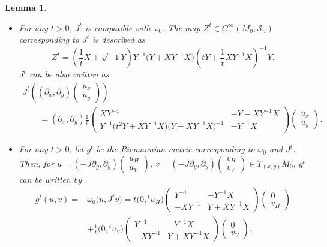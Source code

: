 \documentclass[10pt,a4paper]{amsart}
\numberwithin{equation}{section}
\newtheorem{Lemma}[Theorem]{Lemma}
\begin{document}
\begin{Lemma}\label{compatibility2}\quad
\begin{itemize}\itemsep=0pt
\item[$(1)$] For any $t>0$, $J^t$ is compatible with $\omega_0$. The map $Z^t\in C^\infty ( M_0,{\mathcal S}_n)$ corresponding to $J^t$ is described as
\begin{equation*}
Z^t=\left(\frac{1}{t}X+\sqrt{-1}Y\right)Y^{-1}\bigl(Y+XY^{-1}X\bigr)\left(tY+\frac{1}{t}XY^{-1}X\right)^{-1}Y.
\end{equation*}
$J^t$ can be also written as
\begin{gather*}
J^t\left((\partial_x, \partial_y)
\begin{pmatrix}
u_x \\
u_y
\end{pmatrix}\right)\\
\qquad=(\partial_x, \partial_y)
\frac{1}{t}
\begin{pmatrix}
XY^{-1} & -Y-XY^{-1}X \\
Y^{-1}\bigl(t^2Y+XY^{-1}X\bigr)\bigl(Y+XY^{-1}X\bigr)^{-1} & -Y^{-1}X
\end{pmatrix}
\begin{pmatrix}
u_x \\
u_y
\end{pmatrix}.
\end{gather*}
\item[$(2)$] For any $t>0$, let $g^t$ be the Riemannian metric corresponding to $\omega_0$ and $J^t$. Then, for $u=(-J\partial_y, \partial_y)
\left(\begin{smallmatrix}
u_H\\
u_V
\end{smallmatrix}\right)$, $v=(-J\partial_y, \partial_y)
\left(\begin{smallmatrix}
v_H\\
v_V
\end{smallmatrix}\right)
\in T_{(x,y)}M_0$, $g^t$ can be written by
\begin{align*}
g^t(u,v)={}&\omega_0\bigl( u,J^tv \bigr)
= t\bigl(0,{}^tu_H\bigr)
\begin{pmatrix}
Y^{-1} & -Y^{-1}X \\
-XY^{-1} & Y+XY^{-1}X
\end{pmatrix}
\begin{pmatrix}
0\\
v_H
\end{pmatrix}
\\
&
+\frac{1}{t}\bigl(0,{}^tu_V\bigr)
\begin{pmatrix}
Y^{-1} & -Y^{-1}X \\
-XY^{-1} & Y+XY^{-1}X
\end{pmatrix}
\begin{pmatrix}
0\\
v_V
\end{pmatrix}.
\end{align*}
\end{itemize}
\end{Lemma}
\end{document}
